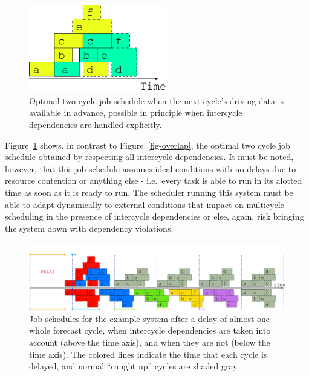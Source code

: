 \documentclass[11pt,a4paper]{article}
\begin{document}
\begin{figure}
    \begin{center}
        \includegraphics[width=6cm]{inkscape-svg/timeline-two-cycles-optimal} 
    \end{center}
    \caption[Optimal two-cycle job schedule]{\small Optimal two cycle
    job schedule when the next cycle's driving data is available in
    advance, possible in principle when intercycle dependencies are
    handled explicitly.} 
    \label{fig-optimal-two}
\end{figure} 

Figure~\ref{fig-optimal-two} shows, in contrast to
Figure~\ref{fig-overlap}, the optimal two cycle job schedule obtained by
respecting all intercycle dependencies. It must be noted, however, that
this job schedule assumes ideal conditions with no delays due to
resource contention or anything else - i.e.\ every task is able to run
in its alotted time as soon as it is ready to run. The scheduler running
this system must be able to adapt dynamically to external conditions 
that impact on multicycle scheduling in the presence of
intercycle dependencies or else, again, risk bringing the system down
with dependency violations.

\begin{figure}
    \begin{center}
        \includegraphics[width=12cm]{inkscape-svg/timeline-three} 
    \end{center}
    \caption[Post delay comparison of job schedules]{\small Job
    schedules for the example system after a delay of almost one whole
    forecast cycle, when intercycle dependencies are
    taken into account (above the time axis), and when they are not
    (below the time axis). The colored lines indicate the time that
    each cycle is delayed, and normal ``caught up'' cycles
    are shaded gray.} 
    \label{fig-time-three}
\end{figure} 
\end{document}
